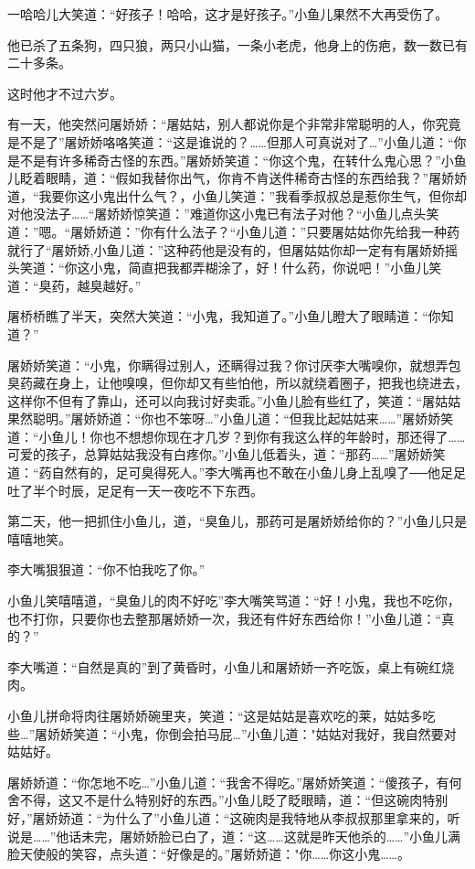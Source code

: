 \documentclass[12pt,oneside]{book}
\begin{document}
一哈哈儿大笑道：``好孩子！哈哈，这才是好孩子。''小鱼儿果然不大再受伤了。

他已杀了五条狗，四只狼，两只小山猫，一条小老虎，他身上的伤疤，数一数已有二十多条。

这时他才不过六岁。

有一天，他突然问屠娇娇：``屠姑姑，别人都说你是个非常非常聪明的人，你究竟是不是了''屠娇娇咯咯笑道：``这是谁说的？\ldots\ldots 但那人可真说对了\ldots{}''小鱼儿道：``你是不是有许多稀奇古怪的东西。''屠娇娇笑道：``你这个鬼，在转什么鬼心思？''小鱼儿眨着眼睛，道：``假如我替你出气，你肯不肯送件稀奇古怪的东西给我？''屠娇娇道，``我要你这小鬼出什么气？，小鱼儿笑道：''我看季叔叔总是惹你生气，但你却对他没法子\ldots\ldots{}``屠娇娇惊笑道：''难道你这小鬼已有法子对他？``小鱼儿点头笑道：''嗯。``屠娇娇道：''你有什么法子？``小鱼儿道：''只要屠姑姑你先给我一种药就行了``屠娇娇,小鱼儿道：''这种药他是没有的，但屠姑姑你却一定有有屠娇娇摇头笑道：``你这小鬼，简直把我都弄糊涂了，好！什么药，你说吧！''小鱼儿笑道：``臭药，越臭越好。''

屠桥桥瞧了半天，突然大笑道：``小鬼，我知道了。''小鱼儿瞪大了眼睛道：``你知道？''

屠娇娇笑道：``小鬼，你瞒得过别人，还瞒得过我？你讨厌李大嘴嗅你，就想弄包臭药藏在身上，让他嗅嗅，但你却又有些怕他，所以就绕着圈子，把我也绕进去，这样你不但有了靠山，还可以向我讨好卖乖。''小鱼儿脸有些红了，笑道：``屠姑姑果然聪明。''屠娇娇道：``你也不笨呀\ldots{}''小鱼儿道：``但我比起姑姑来\ldots\ldots{}''屠娇娇笑道：``小鱼儿！你也不想想你现在才几岁？到你有我这么样的年龄时，那还得了\ldots\ldots 可爱的孩子，总算姑姑我没有白疼你。''小鱼儿低着头，道：``那药\ldots\ldots{}''屠娇娇笑道：``药自然有的，足可臭得死人。''李大嘴再也不敢在小鱼儿身上乱嗅了──他足足吐了半个时辰，足足有一天一夜吃不下东西。

第二天，他一把抓住小鱼儿，道，``臭鱼儿，那药可是屠娇娇给你的？''小鱼儿只是嘻嘻地笑。

李大嘴狠狠道：``你不怕我吃了你。''

小鱼儿笑嘻嘻道，``臭鱼儿的肉不好吃''李大嘴笑骂道：``好！小鬼，我也不吃你，也不打你，只要你也去整那屠娇娇一次，我还有件好东西给你！''小鱼儿道：``真的？''

李大嘴道：``自然是真的''到了黄昏时，小鱼儿和屠娇娇一齐吃饭，桌上有碗红烧肉。

小鱼儿拼命将肉往屠娇娇碗里夹，笑道：``这是姑姑是喜欢吃的莱，姑姑多吃些\ldots{}''屠娇娇笑道：``小鬼，你倒会拍马屁\ldots{}''小鱼儿道："姑姑对我好，我自然要对姑姑好。

屠娇娇道：``你怎地不吃\ldots{}''小鱼儿道：``我舍不得吃。''屠娇娇笑道：``傻孩子，有何舍不得，这又不是什么特别好的东西。''小鱼儿眨了眨眼睛，道：``但这碗肉特别好，''屠娇娇道：``为什么了''小鱼儿道：``这碗肉是我特地从李叔叔那里拿来的，听说是\ldots\ldots{}''他话未完，屠娇娇脸已白了，道：``这\ldots\ldots 这就是昨天他杀的\ldots\ldots{}''小鱼儿满脸天使般的笑容，点头道：``好像是的。''屠娇娇道："你\ldots\ldots 你这小鬼\ldots\ldots。
\end{document}
